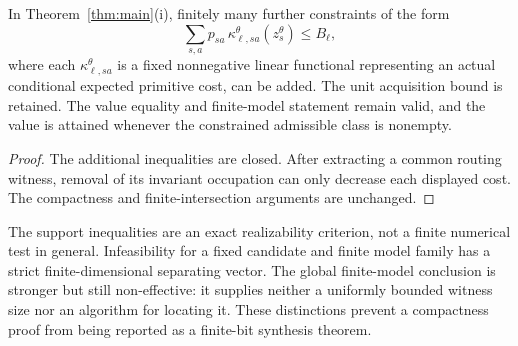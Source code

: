 \begin{corollary}\label{cor:costs}
In Theorem~\ref{thm:main}(i), finitely many further constraints of the form
\[
 \sum_{s,a}p_{sa}\,\kappa_{\ell,sa}^\theta(z_s^\theta)\le B_\ell,
\]
where each $\kappa_{\ell,sa}^\theta$ is a fixed nonnegative linear functional representing an actual conditional expected primitive cost, can be added. The unit acquisition bound is retained. The value equality and finite-model statement remain valid, and the value is attained whenever the constrained admissible class is nonempty.
\end{corollary}
\begin{proof}
The additional inequalities are closed. After extracting a common routing witness, removal of its invariant occupation can only decrease each displayed cost. The compactness and finite-intersection arguments are unchanged.
\end{proof}

\begin{remark}
The support inequalities are an exact realizability criterion, not a finite numerical test in general. Infeasibility for a fixed candidate and finite model family has a strict finite-dimensional separating vector. The global finite-model conclusion is stronger but still non-effective: it supplies neither a uniformly bounded witness size nor an algorithm for locating it. These distinctions prevent a compactness proof from being reported as a finite-bit synthesis theorem.
\end{remark}
